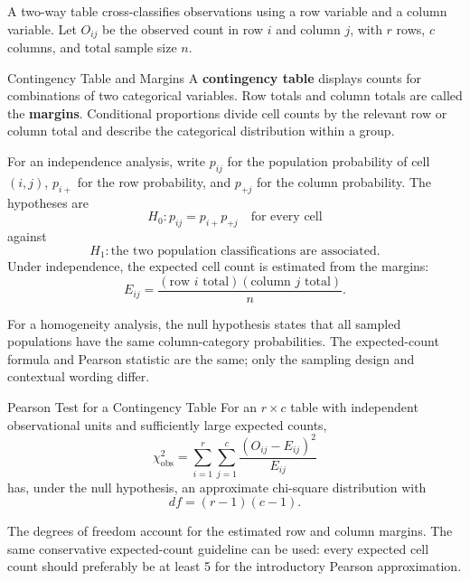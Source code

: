 A two-way table cross-classifies observations using a row variable and a column variable. Let $O_{ij}$ be the observed count in row $i$ and column $j$, with $r$ rows, $c$ columns, and total sample size $n$.

\begin{definition}{Contingency Table and Margins}
A \textbf{contingency table} displays counts for combinations of two categorical variables. Row totals and column totals are called the \textbf{margins}. Conditional proportions divide cell counts by the relevant row or column total and describe the categorical distribution within a group.
\end{definition}

For an independence analysis, write $p_{ij}$ for the population probability of cell $(i,j)$, $p_{i+}$ for the row probability, and $p_{+j}$ for the column probability. The hypotheses are
\[
H_0:p_{ij}=p_{i+}p_{+j}\quad\text{for every cell}
\]
against
\[
H_1:\text{the two population classifications are associated}.
\]
Under independence, the expected cell count is estimated from the margins:
\[
E_{ij}
=\frac{(\text{row }i\text{ total})(\text{column }j\text{ total})}{n}.
\]

For a homogeneity analysis, the null hypothesis states that all sampled populations have the same column-category probabilities. The expected-count formula and Pearson statistic are the same; only the sampling design and contextual wording differ.

\begin{theorem}{Pearson Test for a Contingency Table}
For an $r\times c$ table with independent observational units and sufficiently large expected counts,
\[
\chi^2_{\mathrm{obs}}
=\sum_{i=1}^{r}\sum_{j=1}^{c}
\frac{(O_{ij}-E_{ij})^2}{E_{ij}}
\]
has, under the null hypothesis, an approximate chi-square distribution with
\[
df=(r-1)(c-1).
\]
\end{theorem}

The degrees of freedom account for the estimated row and column margins. The same conservative expected-count guideline can be used: every expected cell count should preferably be at least 5 for the introductory Pearson approximation.

